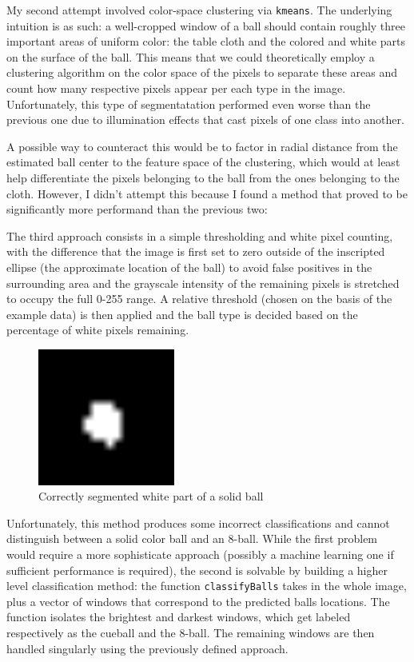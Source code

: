 My second attempt involved color-space clustering via \verb|kmeans|. 
The underlying intuition is as such: a well-cropped window of a ball should 
contain roughly three important areas of uniform color: the table cloth and 
the colored and white parts on the surface of the ball. This means that 
we could theoretically employ a clustering algorithm on the color space 
of the pixels to separate these areas and count how many respective pixels 
appear per each type in the image.  
Unfortunately, this type of segmentatation performed even worse than the 
previous one due to illumination effects that cast pixels of one class 
into another.

A possible way to counteract this would be to factor in radial distance 
from the estimated ball center to the feature space of the clustering, 
which would at least help differentiate the pixels belonging to the 
ball from the ones belonging to the cloth. However, I didn't attempt 
this because I found a method that proved to be significantly more 
performand than the previous two:

The third approach consists in a simple thresholding and white pixel 
counting, with the difference that the image is first set to zero 
outside of the inscripted ellipse (the approximate location of the ball)
to avoid false positives in the surrounding area and the grayscale 
intensity of the remaining pixels is stretched to occupy the full 
0-255 range. A relative threshold (chosen on the basis of the example 
data) is then applied and the ball type is decided based on the 
percentage of white pixels remaining.

\begin{figure}[h]
  \centering
  \includegraphics[width=0.4\textwidth]{./imgs/difficult_solid_identified.png}
  \caption{Correctly segmented white part of a solid ball}
\end{figure}

Unfortunately, this method produces some incorrect classifications 
and cannot distinguish between a solid color ball and an 8-ball. 
While the first problem would require a more sophisticate approach 
(possibly a machine learning one if sufficient performance is 
required), the second is solvable by building a higher level 
classification method: the function \verb|classifyBalls| takes 
in the whole image, plus a vector of windows that correspond to 
the predicted balls locations. 
The function isolates the brightest and darkest windows, which 
get labeled respectively as the cueball and the 8-ball. 
The remaining windows are then handled singularly using the previously 
defined approach.